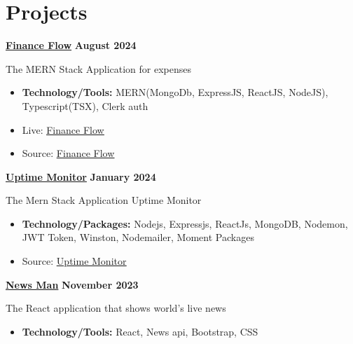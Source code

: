 \documentclass[letterpaper, 11pt]{article}
\newcommand{\bulletSpace}{\vspace{-8pt}}
\newcommand{\secStartSpace}{\vspace{3pt}}
\newcommand{\spaceCollapse}{\vspace{-5pt}}
\begin{document}



\section{\color{blue} \textbf{Projects}}
\secStartSpace

\begin{addmargin}[1em]{1em}
\noindent\href{https://github.com/sukhlotey/Finance-Flow}{\textbf{Finance Flow}}  \hfill \textbf{August 2024} 
		
	\noindent The MERN Stack Application for expenses
	\spaceCollapse
	\begin{itemize}
		\item \textbf{Technology/Tools:} MERN(MongoDb, ExpressJS, ReactJS, NodeJS), Typescript(TSX), Clerk auth
		      \bulletSpace
            	\item Live:  \href{https://personal-financeflow.netlify.app/auth}
  {\underline{Finance Flow}}
		\item Source:  \href{https://github.com/sukhlotey/Finance-Flow}
  {\underline{Finance Flow}}
	\end{itemize}
		
 \noindent\href{https://github.com/sukhlotey/Uptime-monitor}{\textbf{Uptime Monitor}}  \hfill \textbf{January 2024} 
		
	\noindent The Mern Stack Application Uptime Monitor
	\spaceCollapse
	\begin{itemize}
		\item \textbf{Technology/Packages:} Nodejs, Expressjs, ReactJs, MongoDB, Nodemon, JWT Token, Winston, Nodemailer, Moment Packages

		      \bulletSpace
        
		\item Source:  \href{https://github.com/sukhlotey/Uptime-monitor}{\underline{Uptime Monitor}}
	\end{itemize}
	\noindent\href{https://github.com/sukhlotey/newsdaily}{\textbf{News Man}}  \hfill \textbf{November 2023} 
		
	\noindent The React application that shows world's live news
	\spaceCollapse
	\begin{itemize}
		\item \textbf{Technology/Tools:} React, News api, Bootstrap, CSS
		      \bulletSpace
        

\end{itemize}
\end{addmargin}
\end{document}
